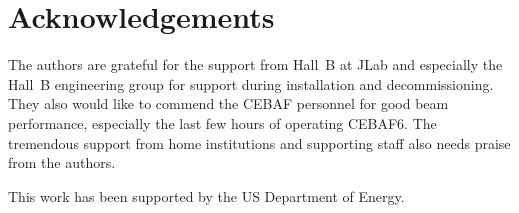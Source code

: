 \documentclass[final,3p,times,twocolumn]{elsarticle}
\begin{document}



\section{Acknowledgements}
The authors are grateful for the support from Hall~B at JLab and especially the Hall~B engineering 
group for support during installation and decommissioning. They also would like to commend the 
CEBAF personnel for good beam performance, especially the last few hours of operating CEBAF6. 
The tremendous support from home institutions and supporting staff also needs praise from the 
authors. 

This work has been supported by the US Department of Energy. 


\end{document}
